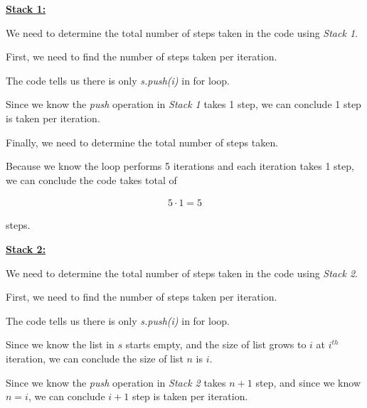 \documentclass[12pt]{article}
\begin{document}
\begin{enumerate}[a.]
    \underline{\textbf{Stack 1:}}

    \bigskip

    We need to determine the total number of steps taken in the code using \textit{Stack 1}.

    \bigskip

    First, we need to find the number of steps taken per iteration.

    \bigskip

    The code tells us there is only \textit{s.push(i)} in for loop.

    \bigskip

    Since we know the \textit{push} operation in \textit{Stack 1} takes 1 step,
    we can conclude 1 step is taken per iteration.

    \bigskip

    Finally, we need to determine the total number of steps taken.

    \bigskip

    Because we know the loop performs 5 iterations and each iteration takes 1 step,
    we can conclude the code takes total of

    \begin{align}
        5 \cdot 1 = 5
    \end{align}

    steps.

    \bigskip

    \underline{\textbf{Stack 2:}}

    \bigskip

    We need to determine the total number of steps taken in the code using \textit{Stack 2}.

    \bigskip

    First, we need to find the number of steps taken per iteration.

    \bigskip

    The code tells us there is only \textit{s.push(i)} in for loop.

    \bigskip

    Since we know the list in $s$ starts empty, and the size of list grows to $i$ at $i^{th}$
    iteration, we can conclude the size of list $n$ is $i$.

    \bigskip

    Since we know the \textit{push} operation in \textit{Stack 2} takes $n+1$ step,
    and since we know $n = i$, we can conclude $i+1$ step is taken per iteration.

    \bigskip


\end{enumerate}
\end{document}
